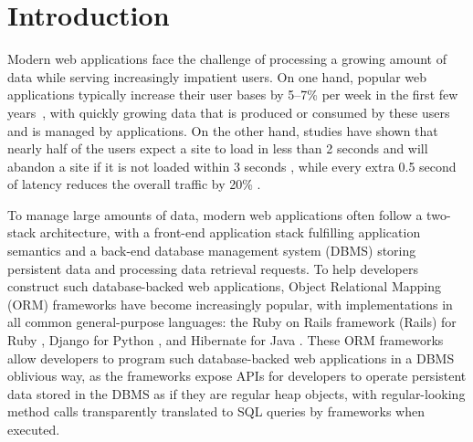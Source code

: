 \section{Introduction}
\label{sec:intro}



Modern web applications face the challenge of processing a growing amount of data while serving increasingly impatient users. On one hand, popular web applications typically increase their user bases by 5--7\% per week in the first few years~\cite{startup}, with quickly growing data that is produced or consumed by these users and is managed by applications. 
On the other hand, studies have shown that nearly half of the users expect a site to load in less than 2 seconds and will abandon a site if it is not loaded within 3 seconds \cite{akamai2011}, while every extra 0.5 second of latency reduces the overall traffic by 20\% \cite{google.2006}.


To manage large amounts of data, modern web applications often follow a two-stack architecture, with a front-end application stack fulfilling application semantics and a back-end database management system (DBMS) storing persistent data and processing data retrieval requests.
To help developers %
construct such database-backed web applications, Object Relational Mapping (ORM) frameworks have become increasingly popular, with implementations in all common general-purpose languages: 
the Ruby on Rails framework (Rails) for Ruby \cite{ror}, Django for Python \cite{django}, and Hibernate for Java \cite{hibernate}. These ORM frameworks allow developers to program such database-backed web applications in a DBMS oblivious way, as the frameworks expose APIs for developers to operate persistent data stored in the DBMS as if they are regular heap objects, with regular-looking method calls transparently translated to SQL queries by frameworks when executed.

